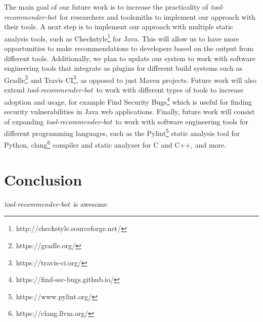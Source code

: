 \documentclass[sigconf,review,anonymous]{acmart}
\newcommand{\tool}{\textsl{tool-recommender-bot}}
\begin{document}
The main goal of our future work is to increase the practicality of \tool~for researchers and toolsmiths to implement our approach with their tools. A next step is to implement our approach with multiple static analysis tools, such as Checkstyle\footnote{http://checkstyle.sourceforge.net/} for Java. This will allow us to have more opportunities to make recommendations to developers based on the output from different tools. Additionally, we plan to update our system to work with software engineering tools that integrate as plugins for different build systems such as Gradle\footnote{https://gradle.org/} and Travis CI\footnote{https://travis-ci.org/}, as opposed to just Maven projects. Future work will also extend \tool~to work with different types of tools to increase adoption and usage, for example Find Security Bugs\footnote{https://find-sec-bugs.github.io/} which is useful for finding security vulnerabilities in Java web applications. Finally, future work will consist of expanding \tool~to work with software engineering tools for different programming languages, such as the Pylint\footnote{https://www.pylint.org/} static analysis tool for Python, clang\footnote{https://clang.llvm.org/} compiler and static analyzer for C and C++, and more.



\section{Conclusion}

\tool~is awesome




  
%

\end{document}

